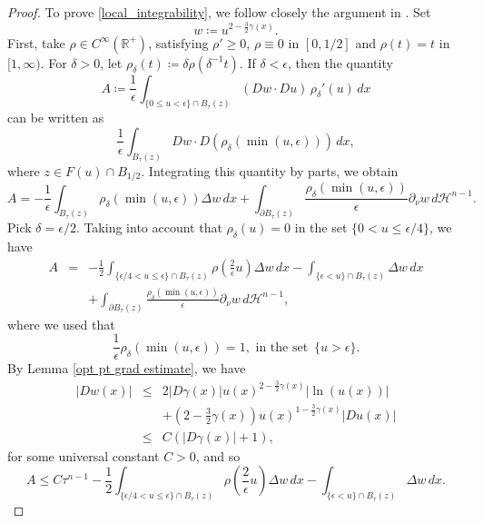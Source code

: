\documentclass[reqno,11pt]{amsart}
\newcommand{\1}{\mathds{1}}
\numberwithin{equation}{section}
\begin{document}
\begin{proof}
To prove \eqref{local_integrability}, we follow closely the argument in \cite[Lemma 2.5]{P2}. Set
$$
	w \coloneqq u^{2-\frac{3}{2}\gamma(x)}.
$$  First, take $\rho \in C^\infty(\mathbb{R}^+)$, satisfying $\rho' \geq 0$, $\rho \equiv 0$ in $[0,1/2]$ and $\rho(t) = t$ in $[1,\infty)$. For $\delta>0$, let $\rho_\delta(t) \coloneqq \delta \rho(\delta^{-1}t)$. If $\delta < \epsilon$, then the quantity
\begin{equation}\label{penalization argument}
    A \coloneqq \frac{1}{\epsilon} \int_{\{0 \leq u < \epsilon \} \cap B_\tau(z)} \left(Dw \cdot Du\right) \, \rho_\delta'(u)\,dx
\end{equation}
can be written as
$$
    \frac{1}{\epsilon} \int_{ B_\tau(z)} Dw \cdot D\left(\rho_\delta(\min(u,\epsilon))\right)\, dx,
$$
where $z \in F(u)\cap B_{1/2}$. Integrating this quantity by parts, we obtain
$$
    A = - \frac{1}{\epsilon} \int_{B_\tau(z)} \rho_\delta(\min(u,\epsilon)) \Delta w\,dx + \int_{\partial B_\tau(z)} \frac{\rho_\delta(\min(u,\epsilon) )}{\epsilon} \partial_{\nu} w\, d\mathcal{H}^{n-1}.
$$
Pick $\delta = \epsilon/2$. Taking into account that $\rho_\delta(u) = 0$ in the set $\{ 0 < u \leq \epsilon/4 \}$, we have
\begin{eqnarray*}
        A & = & \displaystyle -\frac{1}{2}\int_{\{ \epsilon/4 < u \leq \epsilon\}\cap B_\tau(z)} \rho\left(\frac{2}{\epsilon} u\right) \Delta w\,dx  - \int_{\{ \epsilon < u \}\cap B_\tau(z)} \Delta w\,dx \\
        &  & +\displaystyle \int_{\partial B_\tau(z)} \frac{\rho_\delta(\min(u,\epsilon) )}{\epsilon} \partial_{\nu} w\, d\mathcal{H}^{n-1},
\end{eqnarray*}
where we used that 
$$
	\frac{1}{\epsilon}\rho_\delta(\min(u,\epsilon)) = 1, \text{ in the set }\, \{u>\epsilon\}.	
$$
By Lemma \ref{opt pt grad estimate}, we have
\begin{eqnarray*}
        |Dw(x)| & \leq & \displaystyle 2|D\gamma(x)|u(x)^{2-\frac{3}{2}\gamma(x)} |\ln(u(x))|\\
        &  & + \displaystyle  \left(2-\frac{3}{2}\gamma(x)\right)u(x)^{1-\frac{3}{2}\gamma(x)}|Du(x)|  \\
         & \leq & \displaystyle C\left(|D\gamma(x)|+1\right),
\end{eqnarray*}
for some universal constant $C>0$, and so
\begin{equation}\label{pen arg II}
    A \leq C\tau^{n-1} - \frac{1}{2}\int_{\{ \epsilon/4 < u \leq \epsilon\}\cap B_\tau(z)} \rho\left(\frac{2}{\epsilon} u\right) \Delta w\,dx  - \int_{\{ \epsilon < u \}\cap B_\tau(z)} \Delta w\,dx.

\end{equation}
\end{proof}
\end{document}
